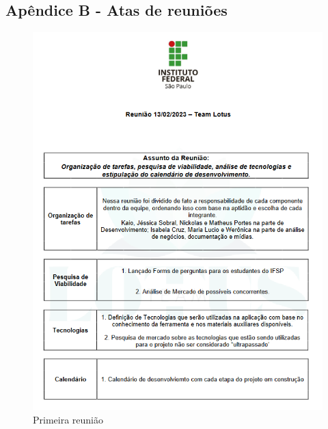 \documentclass[12pt,a4paper]{article}
\begin{document}
\newpage

\subsection{Apêndice B  - Atas de reuniões}
\begin{figure}[H]
    \centering
     \includegraphics[width=15cm]{ilus1.png}
     \caption{Primeira reunião}
     \label{fig07}
\end{figure}
\end{document}
